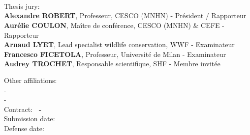 


\cleardoublepage
{}
\thispagestyle{empty}

\begin{center}
    {%
        \Large\scshape\bfseries\setTitleFont\color{wrtxColorPrimary}\portfolioMainTitle\\
    }%
    \vspace{0.1cm}
    {%
        \normalsize\setTitleFont\color{wrtxColorPrimary}\portfolioSubTitle\\
    }%
    \vspace{0.1cm}
    {%
    \TEXTby\ \portfolioAuthorName%
    }%
\end{center}
%
\vspace*{0.5cm}
%
\begin{flushleft}
    \small
    \singlespace

    \vfill

    Thesis jury:\\
    \smallskip
    \hspace{4mm}\textbf{Alexandre ROBERT}, Professeur, CESCO (MNHN) -  Président / Rapporteur \\
    \hspace{4mm}\textbf{Aurélie COULON}, Maître de conférence, CESCO (MNHN) \& CEFE - Rapporteur \\
    \hspace{4mm}\textbf{Arnaud LYET}, Lead specialist wildlife conservation, WWF - Examinateur\\
    \hspace{4mm}\textbf{Francesco FICETOLA}, Professeur, Université de Milan - Examinateur\\
    \hspace{4mm}\textbf{Audrey TROCHET}, Responsable scientifique, SHF - Membre invitée\\

    \vfill

    Other affiliations:\\
    \smallskip
    \hspace{4mm}\textbf{\portfolioInstituteShort} - \portfolioInstituteLong\\
    \hspace{4mm}\textbf{\portfolioUniversityShort} - \portfolioUniversityLong\\


    \vfill
    Contract: \textbf{
        \portfolioDateContractStart\ - \portfolioDateContractEnd
        }\\
    Submission date: \textbf{\portfolioDateManuscript}\\
    Defense date: \textbf{\portfolioDateDefense}
    \vfill
\end{flushleft}%

